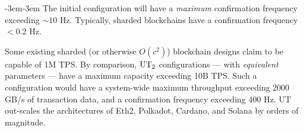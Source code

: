 \begin{adjustwidth}{-3em}{-3em}
The initial configuration will have a \emph{maximum} confirmation frequency exceeding $\sim 10$ Hz.
Typically, sharded blockchains have a confirmation frequency $< 0.2$ Hz.
\par
Some existing sharded (or otherwise $O(c^2)$) blockchain designs claim to be capable of 1M TPS.
By comparison, $\text{UT}_{2}$ configurations --- with \emph{equivalent} parameters --- have a maximum capacity exceeding 10B TPS.
Such a configuration would have a system-wide maximum throughput exceeding 2000 GB/s of transaction data, and a confirmation frequency exceeding 400 Hz.
UT out-scales the architectures of Eth2, Polkadot, Cardano, and Solana by orders of magnitude.
%
%
\par
{}
\end{adjustwidth}

